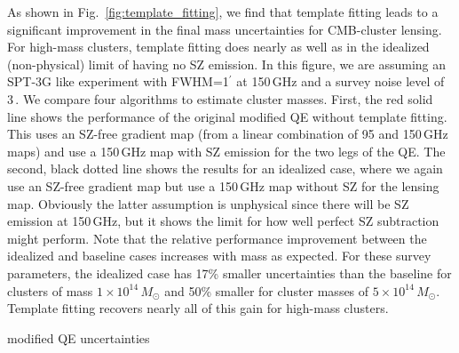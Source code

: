 {%

As shown in Fig.~\ref{fig:template_fitting}, we find that template fitting leads to a significant improvement in the final mass uncertainties for CMB-cluster lensing. 
For high-mass clusters, template fitting does nearly as well as in the idealized (non-physical) limit of having no SZ emission. 
In this figure, we are assuming an SPT-3G like experiment with FWHM=1$^\prime$ at 150\,GHz and a survey noise level of 3\,\ukarcmin{}. 
We compare four algorithms to estimate cluster masses.  
First, the red solid line shows the performance of the original modified QE without template fitting. 
This uses  an SZ-free gradient map 
(from a linear combination of 95 and 150\,GHz maps) and use a 150\,GHz map with SZ emission for the two legs of the QE. 
The second, black dotted line shows the results for an idealized case, where we again use an SZ-free gradient map but use a 150\,GHz map without SZ for the lensing map. 
Obviously the latter assumption is unphysical since there will be SZ emission at 150\,GHz, but it shows the limit for how well perfect SZ subtraction might perform. 
Note that the relative performance improvement between the idealized and baseline cases increases with mass as expected. 
For these survey parameters, the idealized case has 17\% smaller uncertainties than the baseline for clusters of mass $1\times 10^14\,M_{\odot}$ and 50\% smaller for cluster masses of $5\times 10^14\,M_{\odot}$. 
Template fitting recovers nearly all of this gain for high-mass clusters. 


modified QE uncertainties 


}
